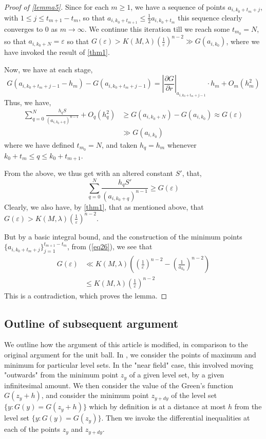 \documentclass{article}
\newcounter{lem}
\theoremstyle{plain}
\theoremstyle{definition}
\theoremstyle{plain}
\begin{document}
\begin{proof}[Proof of \cref{lemma5}]
Since for each $m \ge 1$, we have a sequence of points $a_{i, k_0 + t_m + j}$, with $1 \le j \le t_{m+1} - t_m$, so that $a_{i, k_0 + t_{m+1}} \le \frac{1}{2} a_{i, k_0 + t_m}$ this sequence clearly converges to $0$ as $m \to \infty$. We continue this iteration till we reach some $t_{m_0} = N$, so that $a_{i, k_0 + N} = \varepsilon$ so that $G(\varepsilon) > K(M, \lambda) (\frac{1}{\varepsilon})^{n-2} \gg G(a_{i, k_0})$, where we have invoked the result of \cref{thm1}.

Now, we have at each stage,
\begin{equation} \label{eq25}
G(a_{i, k_0 + t_m + j - 1} - h_m) - G(a_{i, k_0 + t_m + j - 1}) = \left| \frac{\partial G}{\partial r} \right|_{a_{i, k_0 + t_m + j - 1}} \cdot h_m + O_m(h_m^2)
\end{equation}
Thus, we have,
\begin{align*}
\sum_{q=0}^{N} \frac{h_q S}{(a_{i, k_0 + q})^{n-1}} + O_q(h_q^2) &\ge G(a_{i, k_0+N}) - G(a_{i, k_0}) \approx G(\varepsilon) \\
&\gg G(a_{i, k_0})
\end{align*}
where we have defined $t_{m_0} = N$, and taken $h_q = h_m$ whenever $k_0 + t_m \le q \le k_0 + t_{m+1}$.

From the above, we thus get with an altered constant $S'$, that,
\begin{equation} \label{eq26}
\sum_{q=0}^{N} \frac{h_q S'}{(a_{i, k_0 + q})^{n-1}} \ge G(\varepsilon)
\end{equation}
Clearly, we also have, by \cref{thm1}, that as mentioned above, that $G(\varepsilon) > K(M, \lambda) (\frac{1}{\varepsilon})^{n-2}$.

But by a basic integral bound, and the construction of the minimum points $\{a_{i, k_0 + t_m + j}\}_{j=1}^{t_{m+1}-t_m}$, from (\ref{eq26}), we see that 
\begin{align*}
G(\varepsilon) &\ll K(M, \lambda) \left( \left(\frac{1}{\varepsilon}\right)^{n-2} - \left(\frac{1}{a_{k_0}}\right)^{n-2} \right) \\
&\le K(M, \lambda) \left(\frac{1}{\varepsilon}\right)^{n-2}
\end{align*}
This is a contradiction, which proves the lemma.\end{proof}
\subsection{Outline of subsequent argument}
We outline how the argument of this article is modified, in comparison to the original argument for the unit ball. In \cite{Pat25}, we consider the points of maximum and minimum for particular level sets. In the "near field" case, this involved moving "outwards" from the minimum point $z_y$ of a given level set, by a given infinitesimal amount. We then consider the value of the Green's function $G(z_y + h)$, and consider the minimum point $z_{y+dy}$ of the level set $\{y : G(y) = G(z_y + h)\}$ which by definition is at a distance at most $h$ from the level set $\{y : G(y) = G(z_y)\}$. Then we invoke the differential inequalities at each of the points $z_y$ and $z_{y+dy}$.
\end{document}
